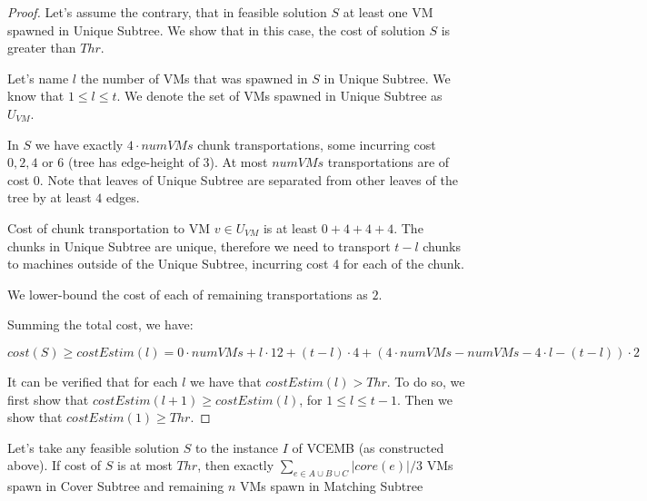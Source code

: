 \begin{proof}
  Let's assume the contrary, that in feasible solution $S$ at least
  one VM spawned in Unique
  Subtree. We show that in this case, the cost of solution $S$ is
  greater than $Thr$. 

  Let's name $l$ the number of VMs that was spawned in $S$ in Unique
  Subtree. We know that $1 \leq l \leq t$. We denote the set of VMs
  spawned in Unique Subtree as $U_{VM}$.

In $S$ we have exactly
  $4 \cdot numVMs$ chunk transportations, some incurring cost $0, 2,
  4$ or $6$ (tree has edge-height of $3$). At most $numVMs$
  transportations are of cost $0$. Note that leaves of Unique Subtree
  are separated from other leaves of the tree by at least $4$ edges. 

  Cost of chunk transportation to VM $v \in U_{VM}$ is at least $0 + 4
  + 4 + 4$. The chunks in Unique Subtree are unique, therefore we need
  to transport $t - l$ chunks to machines outside of the Unique
  Subtree, incurring cost $4$ for each of the chunk.

  We lower-bound the cost of each of remaining transportations as $2$.

Summing the total cost, we have:

$cost(S) \geq costEstim(l) = 0 \cdot numVMs + l \cdot 12 + (t-l)\cdot 4 +
(4\cdot numVMs - numVMs - 4\cdot l - (t-l))\cdot 2$

It can be verified that for each $l$ we have that $costEstim(l) > Thr$. To
do so, we first show that $costEstim(l+1) \geq costEstim(l)$, for
$1\leq l \leq t-1$. Then we show that $costEstim(1) \geq Thr$.
\end{proof}

\begin{theorem}
  Let's take any feasible solution $S$ to the instance $I$ of VCEMB
  (as constructed above). If cost of $S$ is at most $Thr$, then
  exactly $\sum_{e\in A\cup B\cup C}|core(e)|/3$ VMs spawn in Cover
  Subtree and remaining $n$ VMs spawn in Matching Subtree
\end{theorem}

